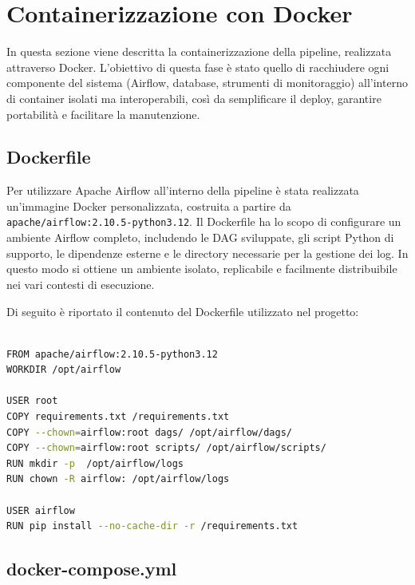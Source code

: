 \section{Containerizzazione con Docker}
\label{sec:impldocker}

In questa sezione viene descritta la containerizzazione della pipeline, realizzata attraverso Docker.
L’obiettivo di questa fase è stato quello di racchiudere ogni componente del sistema (Airflow, database, strumenti di monitoraggio) all’interno di container isolati ma interoperabili, 
così da semplificare il deploy, garantire portabilità e facilitare la manutenzione. 

\subsection{Dockerfile}
\label{subsec:impldockerfile}

Per utilizzare Apache Airflow all’interno della pipeline è stata realizzata un’immagine Docker personalizzata, costruita a partire da \texttt{apache/airflow:2.10.5-python3.12}.  
Il Dockerfile ha lo scopo di configurare un ambiente Airflow completo, includendo le DAG sviluppate, gli script Python di supporto, le dipendenze esterne e le directory necessarie per la gestione dei log.  
In questo modo si ottiene un ambiente isolato, replicabile e facilmente distribuibile nei vari contesti di esecuzione.

Di seguito è riportato il contenuto del Dockerfile utilizzato nel progetto:

\begin{lstlisting}[language=bash, caption={Dockerfile per la creazione dell'immagine personalizzata di Airflow}, label={lst:dockerfile}, basicstyle=\scriptsize\ttfamily]

FROM apache/airflow:2.10.5-python3.12 
WORKDIR /opt/airflow

USER root
COPY requirements.txt /requirements.txt
COPY --chown=airflow:root dags/ /opt/airflow/dags/
COPY --chown=airflow:root scripts/ /opt/airflow/scripts/
RUN mkdir -p  /opt/airflow/logs 
RUN chown -R airflow: /opt/airflow/logs

USER airflow
RUN pip install --no-cache-dir -r /requirements.txt
\end{lstlisting}

\subsection{docker-compose.yml}
\label{subsec:impldocker_compose}

